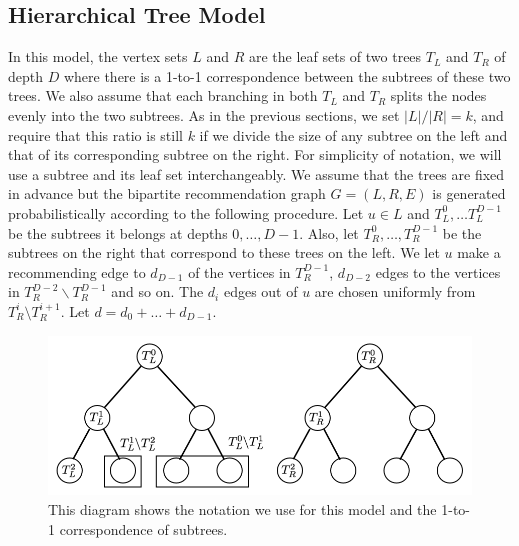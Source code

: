\subsection{Hierarchical Tree Model}
\label{hierarchy}

In this model, the vertex sets $L$
and $R$ are the leaf sets of two trees $T_L$ and $T_R$ of
depth $D$ where there is a 1-to-1 correspondence between the
subtrees of these two trees. We also assume that each branching in
both $T_L$ and $T_R$ splits the nodes evenly into the two
subtrees. As in the previous sections, we set $|L|/|R|=k$,
and require that this ratio is still $k$ if we divide the size of any subtree on the left
and that of its corresponding subtree on the right. For simplicity of notation, we
will use a subtree and its leaf set interchangeably. We assume that the trees are
fixed in advance but the bipartite recommendation graph $G = (L, R, E)$ is generated probabilistically according to
the following procedure. Let $u\in L$ and $T_L^0, \ldots T^{D-1}_L$ be
the subtrees it belongs at depths $0,\ldots, D-1$. Also, let
$T_R^0,\ldots, T_R^{D-1}$ be the subtrees on the right that correspond
to these trees on the left. We let $u$ make a recommending edge to $d_{D-1}$ of
the vertices in $T_{R}^{D-1}$, $d_{D-2}$ edges to the vertices in
$T_{R}^{D-2} \backslash T_{R}^{D-1}$ and so on. The $d_i$ edges out of $u$ are chosen uniformly from $T_R^i \setminus T_R^{i+1}$.
Let $d = d_{0} + \ldots + d_{D-1}$.\vs

\begin{figure}[h]
\vspace{-0.2in}
\centering
\begin{minipage}{0.45\textwidth}
\centering
\includegraphics[width=1.1\textwidth]{images/hierarchy_tree.png}
\caption{This diagram shows the notation we use for this model and the 1-to-1 correspondence of subtrees.}\label{fig:hierarchy}
\end{minipage}
\end{figure}

